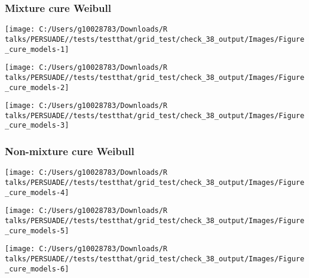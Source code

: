 \documentclass[
]{article}
\begin{document}
\clearpage

\clearpage

\subsubsection{Mixture cure Weibull}\label{mixture-cure-weibull}

\begin{flushleft}\texttt{[image: C:/Users/g10028783/Downloads/R talks/PERSUADE//tests/testthat/grid\_test/check\_38\_output/Images/Figure\_cure\_models-1]} \end{flushleft}

\begin{flushleft}\texttt{[image: C:/Users/g10028783/Downloads/R talks/PERSUADE//tests/testthat/grid\_test/check\_38\_output/Images/Figure\_cure\_models-2]} \end{flushleft}

\begin{flushleft}\texttt{[image: C:/Users/g10028783/Downloads/R talks/PERSUADE//tests/testthat/grid\_test/check\_38\_output/Images/Figure\_cure\_models-3]} \end{flushleft}

\clearpage

\subsubsection{Non-mixture cure Weibull}\label{non-mixture-cure-weibull}

\begin{flushleft}\texttt{[image: C:/Users/g10028783/Downloads/R talks/PERSUADE//tests/testthat/grid\_test/check\_38\_output/Images/Figure\_cure\_models-4]} \end{flushleft}

\begin{flushleft}\texttt{[image: C:/Users/g10028783/Downloads/R talks/PERSUADE//tests/testthat/grid\_test/check\_38\_output/Images/Figure\_cure\_models-5]} \end{flushleft}

\begin{flushleft}\texttt{[image: C:/Users/g10028783/Downloads/R talks/PERSUADE//tests/testthat/grid\_test/check\_38\_output/Images/Figure\_cure\_models-6]} \end{flushleft}

\clearpage
\end{document}
